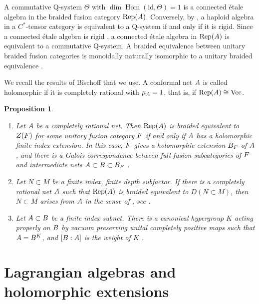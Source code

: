 \documentclass[leqno]{article}
\newcommand{\Q}{\mathrm{Q}}
\let\cal\relax
\newcommand{\cal}{\mathcal}
\DeclareMathOperator{\Rep}{Rep} %
\newtheorem{prop}[thm]{Proposition}
\numberwithin{equation}{section}
\begin{document}
A commutative $\Q$-system $\Theta$ with $\dim \operatorname{Hom}(\mathrm{id},\Theta) = 1$ is a connected \'etale algebra in the braided fusion category $\Rep(\cal A)$. Conversely, by \cite[Theorem 3.2 p.~11]{CGGH23}, a haploid algebra in a $C^*$-tensor category is equivalent to a $\Q$-system if and only if it is rigid. Since a connected \'etale algebra is rigid \cite[Remark 3.4 p.~7]{DMNO13}, a connected \'etale algebra in $\Rep(\cal A)$ is equivalent to a commutative $\Q$-system. A braided equivalence between unitary braided fusion categories is monoidally naturally isomorphic to a unitary braided equivalence \cite[Theorem 5 p.~2]{Reu23}.

We recall the results of Bischoff that we use. A conformal net $\cal A$ is called holomorphic if it is completely rational with $\mu_{\cal A} = 1$, that is, if $\Rep(\cal A) \cong \mathrm{Vec}$.

\begin{prop}
\label{prop:bischoff}
\begin{enumerate}
\item Let $\cal A$ be a completely rational net. Then $\Rep(\cal A)$ is braided equivalent to $Z(\cal F)$ for some unitary fusion category $\cal F$ if and only if $\cal A$ has a holomorphic finite index extension. In this case, $\cal F$ gives a holomorphic extension $\cal B_{\cal F}$ of $\cal A$, and there is a Galois correspondence between full fusion subcategories of $\cal F$ and intermediate nets $\cal A \subset \cal B \subset \cal B_{\cal F}$ \cite[Proposition 4.5 p.~21]{Bis17a}.
\item Let $N \subset M$ be a finite index, finite depth subfactor. If there is a completely rational net $\cal A$ such that $\Rep(\cal A)$ is braided equivalent to $D(N \subset M)$, then $N \subset M$ arises from $\cal A$ in the sense of \cite[Definition 4.1 p.~20]{Bis17a}, see \cite[Proposition 4.7 p.~22]{Bis17a}.
\item Let $\cal A \subset \cal B$ be a finite index subnet. There is a canonical hypergroup $K$ acting properly on $\cal B$ by vacuum preserving unital completely positive maps such that $\cal A = \cal B^K$, and $[\cal B : \cal A]$ is the weight of $K$ \cite[Theorem 1.3 p.~3 and Theorem 4.22 p.~24]{Bis17b}.
\end{enumerate}
\end{prop}

\section{Lagrangian algebras and holomorphic extensions}
\label{sec:lagrangian}
\end{document}
